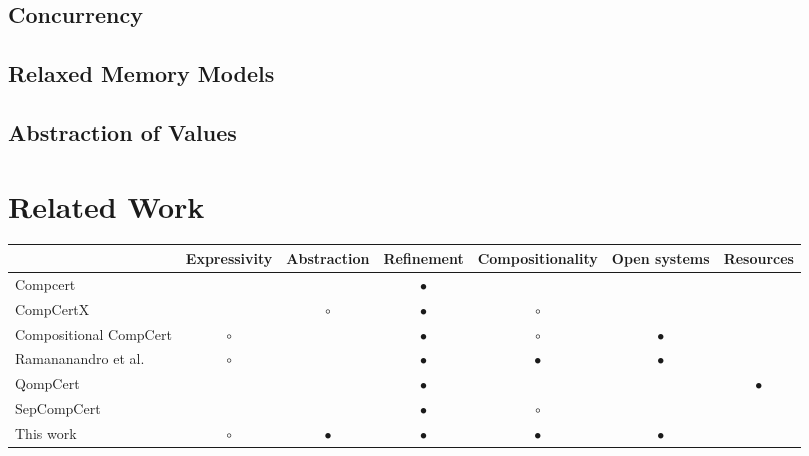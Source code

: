 \documentclass[sigplan,10pt,review,anonymous]{acmart}
\begin{document}
\subsection{Concurrency}
\subsection{Relaxed Memory Models}
\subsection{Abstraction of Values} %


\section{Related Work} %

\begin{table*}
  \begin{tabular}{lcccccc}
    \hline
    & Expressivity & Abstraction & Refinement & Compositionality & Open systems & Resources \\
    \hline
    Compcert \cite{compcert}
      &           &           & $\bullet$ &           &           & \\
    CompCertX \cite{popl2015}
      &           & $\circ$   & $\bullet$ & $\circ$   &           & \\
    Compositional CompCert \cite{compcompcert}
      & $\circ$   &           & $\bullet$ & $\circ$   & $\bullet$ & \\
    Ramananandro et al. \cite{cpp2015}
      & $\circ$   &           & $\bullet$ & $\bullet$ & $\bullet$ & \\
    QompCert \cite{qompcert}
      &           &           & $\bullet$ &           &           & $\bullet$ \\
    SepCompCert \cite{lwsc}
      &           &           & $\bullet$ & $\circ$   &           & \\
    This work
      & $\circ$   & $\bullet$ & $\bullet$ & $\bullet$ & $\bullet$ & \\
    \hline
  \end{tabular}
\end{table*}



\end{document}
